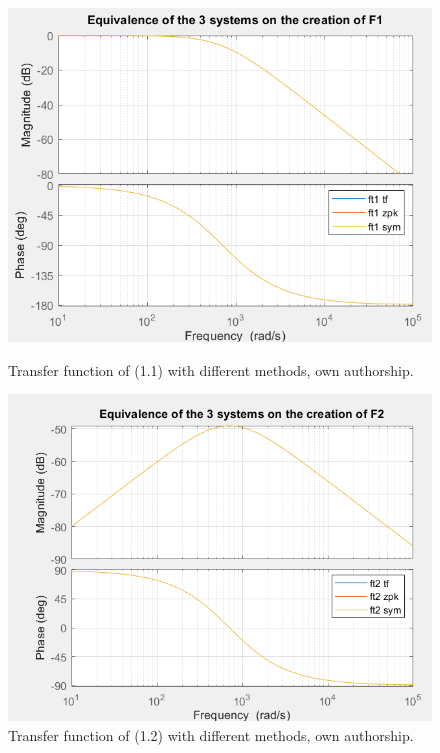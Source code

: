 \documentclass[a4paper,12pt]{article}
\begin{document}
\begin{figure}[H]
    \centering
    \begin{minipage}[b]{0.40\linewidth}
        \centering
        \includegraphics[width=\linewidth]{fonts_lab_1/equivalence_f1.png}
        \caption{Transfer function of (1.1) with different methods, own authorship.}
        \label{fig:equivalence-f1}
    \end{minipage}
    \hspace{0.05\linewidth} %
    \begin{minipage}[b]{0.40\linewidth}
        \centering
        \includegraphics[width=\linewidth]{fonts_lab_1/equivalence_f2.png}
        \caption{Transfer function of (1.2) with different methods, own authorship.}
        \label{fig:equivalence-f2}
    \end{minipage}
\end{figure}
\end{document}
